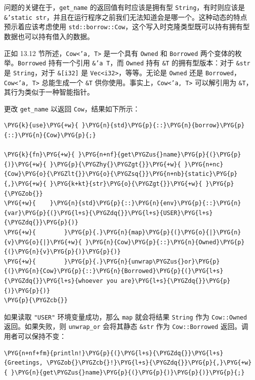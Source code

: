 问题的关键在于，\texttt{get\_name} 的返回值有时应该是拥有型 \texttt{String}，有时则应该是 \texttt{\&'static str}，并且在运行程序之前我们无法知道会是哪一个。这种动态的特点预示着应该考虑使用 \texttt{std::borrow::Cow}，这个写入时克隆类型既可以持有拥有型数据也可以持有借入的数据。

正如 13.12 节所述，\texttt{Cow<'a, T>} 是一个具有 \texttt{Owned} 和 \texttt{Borrowed} 两个变体的枚举。\texttt{Borrowed} 持有一个引用 \texttt{\&'a T}，而 \texttt{Owned} 持有 \texttt{\&T} 的拥有型版本：对于 \texttt{\&str} 是 \texttt{String}，对于 \texttt{\&[i32]} 是 \texttt{Vec<i32>}，等等。无论是 \texttt{Owned} 还是 \texttt{Borrowed}，\texttt{Cow<'a, T>} 总能生成一个 \texttt{\&T} 供你使用。事实上，\texttt{Cow<'a, T>} 可以解引用为 \texttt{\&T}，其行为类似于一种智能指针。

更改 \texttt{get\_name} 以返回 \texttt{Cow}，结果如下所示：

\begin{Verbatim}[commandchars=\\\{\},breaklines=true,breakanywhere=true,fontsize=\codefont,xleftmargin=17bp]
\PYG{k}{use}\PYG{+w}{ }\PYG{n}{std}\PYG{p}{::}\PYG{n}{borrow}\PYG{p}{::}\PYG{n}{Cow}\PYG{p}{;}

\PYG{k}{fn}\PYG{+w}{ }\PYG{n+nf}{get\PYGZus{}name}\PYG{p}{(}\PYG{p}{)}\PYG{+w}{ }\PYG{p}{\PYGZhy{}\PYGZgt{}}\PYG{+w}{ }\PYG{n+nc}{Cow}\PYG{o}{\PYGZlt{}}\PYG{o}{\PYGZsq{}}\PYG{n+nb}{static}\PYG{p}{,}\PYG{+w}{ }\PYG{k+kt}{str}\PYG{o}{\PYGZgt{}}\PYG{+w}{ }\PYG{p}{\PYGZob{}}
\PYG{+w}{    }\PYG{n}{std}\PYG{p}{::}\PYG{n}{env}\PYG{p}{::}\PYG{n}{var}\PYG{p}{(}\PYG{l+s}{\PYGZdq{}}\PYG{l+s}{USER}\PYG{l+s}{\PYGZdq{}}\PYG{p}{)}
\PYG{+w}{        }\PYG{p}{.}\PYG{n}{map}\PYG{p}{(}\PYG{o}{|}\PYG{n}{v}\PYG{o}{|}\PYG{+w}{ }\PYG{n}{Cow}\PYG{p}{::}\PYG{n}{Owned}\PYG{p}{(}\PYG{n}{v}\PYG{p}{)}\PYG{p}{)}
\PYG{+w}{        }\PYG{p}{.}\PYG{n}{unwrap\PYGZus{}or}\PYG{p}{(}\PYG{n}{Cow}\PYG{p}{::}\PYG{n}{Borrowed}\PYG{p}{(}\PYG{l+s}{\PYGZdq{}}\PYG{l+s}{whoever you are}\PYG{l+s}{\PYGZdq{}}\PYG{p}{)}\PYG{p}{)}
\PYG{p}{\PYGZcb{}}
\end{Verbatim}

如果读取 \texttt{"USER"} 环境变量成功，那么 \texttt{map} 就会将结果 \texttt{String} 作为 \texttt{Cow::Owned} 返回。如果失败，则 \texttt{unwrap\_or} 会将其静态 \texttt{\&str} 作为 \texttt{Cow::Borrowed} 返回。调用者可以保持不变：

\begin{Verbatim}[commandchars=\\\{\},breaklines=true,breakanywhere=true,fontsize=\codefont,xleftmargin=17bp]
\PYG{n+nf+fm}{println!}\PYG{p}{(}\PYG{l+s}{\PYGZdq{}}\PYG{l+s}{Greetings, \PYGZob{}\PYGZcb{}!}\PYG{l+s}{\PYGZdq{}}\PYG{p}{,}\PYG{+w}{ }\PYG{n}{get\PYGZus{}name}\PYG{p}{(}\PYG{p}{)}\PYG{p}{)}\PYG{p}{;}
\end{Verbatim}

